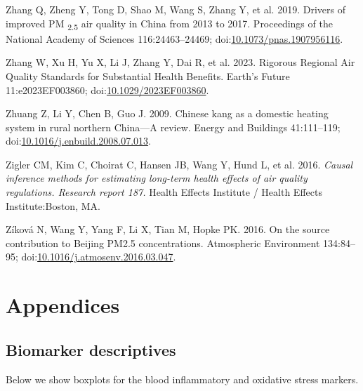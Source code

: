 \documentclass[
  letterpaper,
  DIV=11,
  numbers=noendperiod]{scrartcl}
\newlength{\cslhangindent}
\newenvironment{CSLReferences}[2] %
 {\begin{list}{}{%
  \setlength{\itemindent}{0pt}
  \setlength{\leftmargin}{0pt}
  \setlength{\parsep}{0pt}
  \ifodd #1
   \setlength{\leftmargin}{\cslhangindent}
   \setlength{\itemindent}{-1\cslhangindent}
  \fi
  \setlength{\itemsep}{#2\baselineskip}}}
 {\end{list}}
\begin{document}
\begin{CSLReferences}{1}{1}
Zhang Q, Zheng Y, Tong D, Shao M, Wang S, Zhang Y, et al. 2019. Drivers
of improved {PM} {\textsubscript{2.5}} air quality in {China} from 2013
to 2017. Proceedings of the National Academy of Sciences
116:24463--24469;
doi:\href{https://doi.org/10.1073/pnas.1907956116}{10.1073/pnas.1907956116}.

Zhang W, Xu H, Yu X, Li J, Zhang Y, Dai R, et al. 2023. Rigorous
{Regional Air Quality Standards} for {Substantial Health Benefits}.
Earth's Future 11:e2023EF003860;
doi:\href{https://doi.org/10.1029/2023EF003860}{10.1029/2023EF003860}.

Zhuang Z, Li Y, Chen B, Guo J. 2009. Chinese kang as a domestic heating
system in rural northern {China}---{A} review. Energy and Buildings
41:111--119;
doi:\href{https://doi.org/10.1016/j.enbuild.2008.07.013}{10.1016/j.enbuild.2008.07.013}.

Zigler CM, Kim C, Choirat C, Hansen JB, Wang Y, Hund L, et al. 2016.
\emph{Causal inference methods for estimating long-term health effects
of air quality regulations. {Research} report 187.} Health Effects
Institute / Health Effects Institute:Boston, MA.

Zíková N, Wang Y, Yang F, Li X, Tian M, Hopke PK. 2016. On the source
contribution to {Beijing PM2}.5 concentrations. Atmospheric Environment
134:84--95;
doi:\href{https://doi.org/10.1016/j.atmosenv.2016.03.047}{10.1016/j.atmosenv.2016.03.047}.

\end{CSLReferences}

\newpage
\appendix
\renewcommand{\thefigure}{A\arabic{figure}}
\renewcommand{\thetable}{A\arabic{table}}
\setcounter{figure}{0}
\setcounter{table}{0}

\section{Appendices}\label{appendices}

\subsection{Biomarker descriptives}\label{biomarker-descriptives}

Below we show boxplots for the blood inflammatory and oxidative stress
markers.
\end{document}
